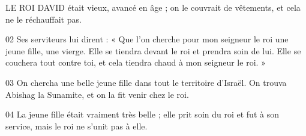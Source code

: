 LE ROI DAVID était vieux, avancé en âge ; on le couvrait de vêtements, et cela ne le réchauffait pas.

02 Ses serviteurs lui dirent : « Que l’on cherche pour mon seigneur le roi une jeune fille, une vierge. Elle se tiendra devant le roi et prendra soin de lui. Elle se couchera tout contre toi, et cela tiendra chaud à mon seigneur le roi. »

03 On chercha une belle jeune fille dans tout le territoire d’Israël. On trouva Abishag la Sunamite, et on la fit venir chez le roi.

04 La jeune fille était vraiment très belle ; elle prit soin du roi et fut à son service, mais le roi ne s’unit pas à elle.
